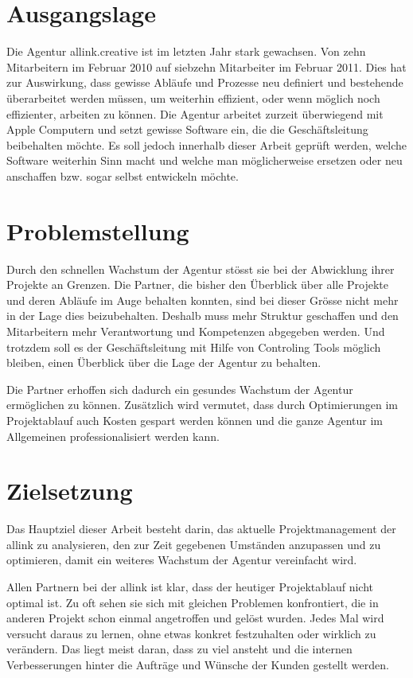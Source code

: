 \section{Ausgangslage}
Die Agentur allink.creative ist im letzten Jahr stark gewachsen. Von zehn
Mitarbeitern im Februar 2010 auf siebzehn Mitarbeiter im Februar 2011. Dies hat 
zur Auswirkung, dass gewisse Abläufe und Prozesse neu definiert und bestehende
überarbeitet werden müssen, um weiterhin effizient, oder wenn möglich noch 
effizienter, arbeiten zu können. Die Agentur arbeitet zurzeit überwiegend mit Apple
Computern und setzt gewisse Software ein, die die Geschäftsleitung beibehalten 
möchte. Es soll jedoch innerhalb dieser Arbeit geprüft werden, welche Software
weiterhin Sinn macht und welche man möglicherweise ersetzen oder neu anschaffen
bzw. sogar selbst entwickeln möchte.

\section{Problemstellung}
Durch den schnellen Wachstum der Agentur stösst sie bei der Abwicklung ihrer
Projekte an Grenzen. Die Partner, die bisher den Überblick über alle
Projekte und deren Abläufe im Auge behalten konnten, sind bei dieser Grösse
nicht mehr in der Lage dies beizubehalten. Deshalb muss mehr Struktur geschaffen und
den Mitarbeitern mehr Verantwortung und Kompetenzen abgegeben werden. Und trotzdem
soll es der Geschäftsleitung mit Hilfe von Controling Tools möglich bleiben,
einen Überblick über die Lage der Agentur zu behalten.

Die Partner erhoffen sich dadurch ein gesundes Wachstum der Agentur ermöglichen
zu können. Zusätzlich wird vermutet, dass durch Optimierungen im Projektablauf
auch Kosten gespart werden können und die ganze Agentur im Allgemeinen 
professionalisiert werden kann.

\section{Zielsetzung}
Das Hauptziel dieser Arbeit besteht darin, das aktuelle Projektmanagement der 
allink zu analysieren, den zur Zeit gegebenen Umständen anzupassen und zu
optimieren, damit ein weiteres Wachstum der Agentur vereinfacht wird.

Allen Partnern bei der allink ist klar, dass der heutiger Projektablauf 
nicht optimal ist. Zu oft sehen sie sich mit gleichen Problemen konfrontiert, 
die in anderen Projekt schon einmal angetroffen und gelöst wurden.
Jedes Mal wird versucht daraus zu lernen, ohne etwas konkret festzuhalten oder
wirklich zu verändern. Das liegt meist daran, dass zu viel ansteht und
die internen Verbesserungen hinter die Aufträge und Wünsche der Kunden
gestellt werden.

